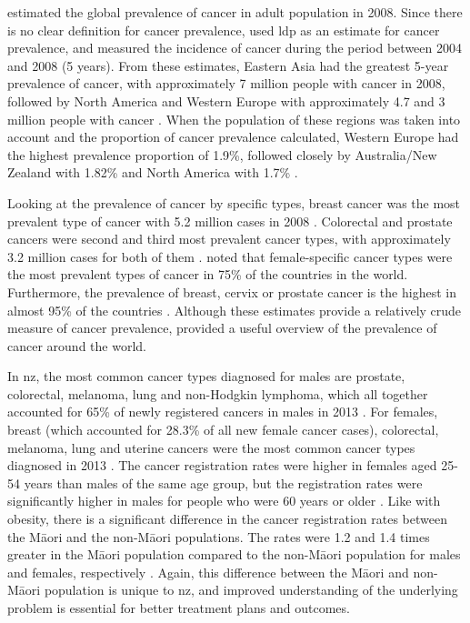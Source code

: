 \citet{Bray2013} estimated the global prevalence of cancer in adult population in 2008.
Since there is no clear definition for cancer prevalence, \citet{Bray2013} used \gls{ldp} as an estimate for cancer prevalence, and measured the incidence of cancer during the period between 2004 and 2008 (5 years).
From these estimates, Eastern Asia had the greatest 5-year prevalence of cancer, with approximately 7 million people with cancer in 2008, followed by North America and Western Europe with approximately 4.7 and 3 million people with cancer \citep{Bray2013}.
When the population of these regions was taken into account and the proportion of cancer prevalence calculated, Western Europe had the highest prevalence proportion of 1.9\%, followed closely by Australia/New Zealand with 1.82\% and North America with 1.7\% \citep{Bray2013}.

Looking at the prevalence of cancer by specific types, breast cancer was the most prevalent type of cancer with 5.2 million cases in 2008 \citep{Bray2013}.
Colorectal and prostate cancers were second and third most prevalent cancer types, with approximately 3.2 million cases for  both of them \citep{Bray2013}.
\citet{Bray2013} noted that female-specific cancer types were the most prevalent types of cancer in 75\% of the countries in the world.
Furthermore, the prevalence of breast, cervix or prostate cancer is the highest in almost 95\% of the countries \citep{Bray2013}.
Although these estimates provide a relatively crude measure of cancer prevalence, \citet{Bray2013} provided a useful overview of the prevalence of cancer  around the world.

In \gls{nz}, the most common cancer types diagnosed for males are prostate, colorectal, melanoma, lung and non-Hodgkin lymphoma, which all together accounted for 65\% of newly registered cancers in males in 2013 \citep{Health2016b}.
For females, breast (which accounted for 28.3\% of all new female cancer cases), colorectal, melanoma, lung and uterine cancers were the most common cancer types diagnosed in 2013 \citep{Health2016b}.
The cancer registration rates were higher in females aged 25-54 years than males of the same age group, but the registration rates were significantly higher in males for people who were 60 years or older \citep{Health2016b}.
Like with obesity, there is a significant difference in the cancer registration rates between the M\=aori and the non-M\=aori populations.
The rates were 1.2 and 1.4 times greater in the M\=aori population compared to the non-M\=aori population for males and females, respectively \citep{Health2016b}.
Again, this difference between the M\=aori and non-M\=aori population is unique to \gls{nz}, and improved understanding of the underlying problem is essential for better treatment plans and outcomes.

